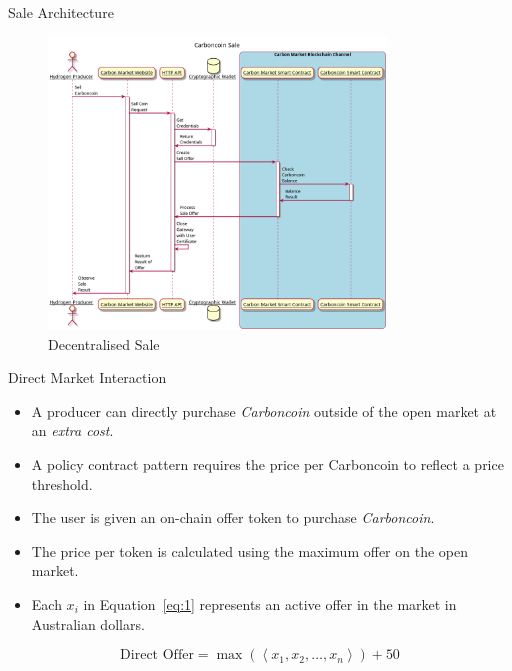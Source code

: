 \begin{frame}{Sale Architecture}
    \begin{figure}
        \caption{Decentralised Sale}
        \centering
        \includegraphics[height=0.7\textheight, width=0.8\textwidth]
        {figures/CreateSale.png}
    \end{figure}
\end{frame}
\begin{frame}{Direct Market Interaction}
    \begin{itemize}
        \item A producer can directly purchase
              \textit{Carboncoin} outside of the open market
              at an \textit{extra cost}.
        \item A policy contract pattern requires the price per
              Carboncoin to reflect a price threshold.
        \item The user is given an on-chain offer token to purchase
              \textit{Carboncoin}.
        \item The price per token is calculated using the maximum offer on the
              open market.
        \item Each $x_i$ in Equation~\ref{eq:1} represents an active offer
              in the market in Australian dollars.
    \end{itemize}
    \begin{equation}
        \text{Direct Offer} =
        \max \left(\left\langle x_1, x_2, \dots, x_n \right\rangle\right) + 50
        \label{eq:1}
    \end{equation}
\end{frame}
